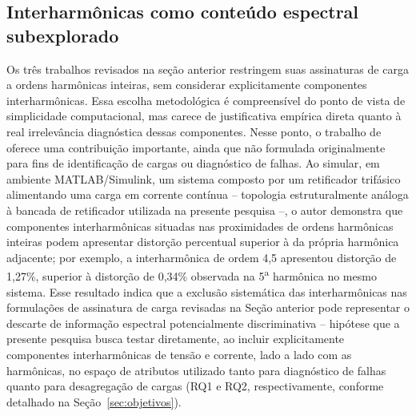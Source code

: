 \documentclass[times,final]{elsarticle}
\begin{document}
\subsection{Interharmônicas como conteúdo espectral subexplorado}
Os três trabalhos revisados na seção anterior restringem suas assinaturas de carga a ordens harmônicas inteiras, sem considerar explicitamente componentes interharmônicas. Essa escolha metodológica é compreensível do ponto de vista de simplicidade computacional, mas carece de justificativa empírica direta quanto à real irrelevância diagnóstica dessas componentes. Nesse ponto, o trabalho de \citet{efe2016} oferece uma contribuição importante, ainda que não formulada originalmente para fins de identificação de cargas ou diagnóstico de falhas. Ao simular, em ambiente MATLAB/Simulink, um sistema composto por um retificador trifásico alimentando uma carga em corrente contínua -- topologia estruturalmente análoga à bancada de retificador utilizada na presente pesquisa --, o autor demonstra que componentes interharmônicas situadas nas proximidades de ordens harmônicas inteiras podem apresentar distorção percentual superior à da própria harmônica adjacente; por exemplo, a interharmônica de ordem 4,5 apresentou distorção de 1,27\%, superior à distorção de 0,34\% observada na 5\textsuperscript{a} harmônica no mesmo sistema. Esse resultado indica que a exclusão sistemática das interharmônicas nas formulações de assinatura de carga revisadas na Seção anterior pode representar o descarte de informação espectral potencialmente discriminativa -- hipótese que a presente pesquisa busca testar diretamente, ao incluir explicitamente componentes interharmônicas de tensão e corrente, lado a lado com as harmônicas, no espaço de atributos utilizado tanto para diagnóstico de falhas quanto para desagregação de cargas (RQ1 e RQ2, respectivamente, conforme detalhado na Seção~\ref{sec:objetivos}).
\end{document}
